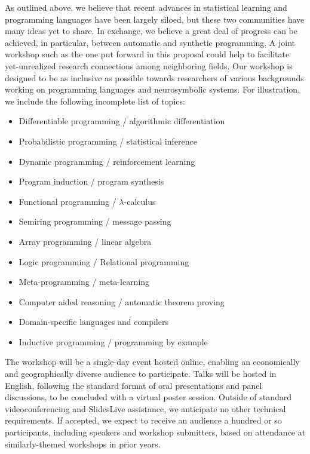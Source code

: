 \documentclass{article}
\begin{document}
    As outlined above, we believe that recent advances in statistical learning and programming languages have been largely siloed, but these two communities have many ideas yet to share. In exchange, we believe a great deal of progress can be achieved, in particular, between automatic and synthetic programming. A joint workshop such as the one put forward in this proposal could help to facilitate yet-unrealized research connections among neighboring fields. Our workshop is designed to be as inclusive as possible towards researchers of various backgrounds working on programming languages and neurosymbolic systems. For illustration, we include the following incomplete list of topics:

    \begin{itemize}
        \item Differentiable programming / algorithmic differentiation
        \item Probabilistic programming / statistical inference
        \item Dynamic programming / reinforcement learning
        \item Program induction / program synthesis
        \item Functional programming / $\lambda$-calculus
        \item Semiring programming / message passing
        \item Array programming / linear algebra
        \item Logic programming / Relational programming
        \item Meta-programming / meta-learning
        \item Computer aided reasoning / automatic theorem proving
        \item Domain-specific languages and compilers
        \item Inductive programming / programming by example
    \end{itemize}

    The workshop will be a single-day event hosted online, enabling an economically and geographically diverse audience to participate. Talks will be hosted in English, following the standard format of oral presentations and panel discussions, to be concluded with a virtual poster session. Outside of standard videoconferencing and SlidesLive assistance, we anticipate no other technical requirements. If accepted, we expect to receive an audience a hundred or so participants, including speakers and workshop submitters, based on attendance at similarly-themed workshops in prior years.
\end{document}
